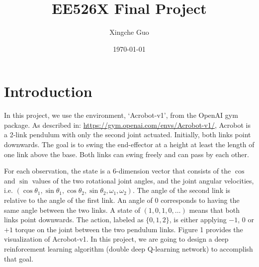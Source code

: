 \documentclass[11pt]{article}
\title{EE526X Final Project}
\author{Xingche Guo}
\date{\today}
\begin{document}
\maketitle


\section{Introduction}

In this project, we use the environment, `Acrobot-v1', from the OpenAI gym package. As described in: \url{https://gym.openai.com/envs/Acrobot-v1/}, Acrobot is a 2-link pendulum with only the second joint actuated. Initially, both links point downwards. The goal is to swing the end-effector at a height at least the length of one link above the base. Both links can swing freely and can pass by each other. 

For each observation, the state is a $6$-dimension vector that consists of the $\cos$ and $\sin$ values of the two rotational joint angles, and the joint angular velocities, i.e. $(\cos\theta_1, \sin\theta_1, \cos\theta_2, \sin\theta_2, \omega_{1}, \omega_{2})$. The angle of the second link is relative to the angle of the first link. An angle of 0 corresponds to having the same angle between the two links. A state of $(1, 0, 1, 0, \dots)$ means that both links point downwards. The action, labeled as $\{0, 1, 2\}$, is either applying $-1$, $0$ or $+1$ torque on the joint between the two pendulum links. Figure 1 provides the visualization of Acrobot-v1. In this project, we are going to design a deep reinforcement learning algorithm (double deep Q-learning network) to accomplish that goal. 
\end{document}
